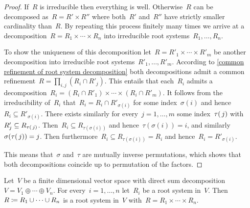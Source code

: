 \begin{proof}
  If~$R$ is irreducible then everything is well.
  Otherwise~$R$ can be decomposed as~$R = R' \times R''$ where both~$R'$ and~$R''$ have strictly smaller cardinality than~$R$.
  By repeating this process finitely many times we arrive at a decomposition~$R = R_1 \times \dotsb \times R_n$ into irreducible root systems~$R_1, \dotsc, R_n$.
  
  To show the uniqueness of this decomposition let~$R = R'_1 \times \dotsb \times R'_m$ be another decomposition into irreducible root systems~$R'_1, \dotsc, R'_m$.
  According to \cref{common refinement of root system decomposition} both decompositions admit a common refinement~$R = \prod_{i,j} (R_i \cap R'_j)$.
  This entails that each~$R_i$ admits a decomposition~$R_i = (R_i \cap R'_1) \times \dotsb \times (R_i \cap R'_m)$.
  It follows from the irreducibility of~$R_i$ that~$R_i = R_i \cap R'_{\sigma(i)}$ for some index~$\sigma(i)$ and hence~$R_i \subseteq R'_{\sigma(i)}$.
  There exists similarly for every~$j = 1, \dotsc, m$ some index~$\tau(\, j)$ with~$R'_j \subseteq R_{\tau(\, j)}$.
  Then~$R_i \subseteq R_{\tau(\sigma(i))}$ and hence~$\tau(\sigma(i)) = i$, and similarly~$\sigma(\tau(\, j)) = j$.
  Then furthermore~$R_i \subseteq R_{\tau(\sigma(i))} = R_i$ and hence~$R_i = R'_{\sigma(i)}$.
  
  This means that~$\sigma$ and~$\tau$ are mutually inverse permutations, which shows that both decompositions coincide up to permutation of the factors.
\end{proof}


\begin{lemma}
  \label{combining root systems}
  Let~$V$ be a finite dimensional vector space with direct sum decomposition~$V = V_1 \oplus \dotsb \oplus V_n$.
  For every~$i = 1, \dotsc, n$ let~$R_i$ be a root system in~$V$.
  Then~$R \coloneqq R_1 \cup \dotsb \cup R_n$ is a root system in~$V$ with~$R = R_1 \times \dotsb \times R_n$.
\end{lemma}


